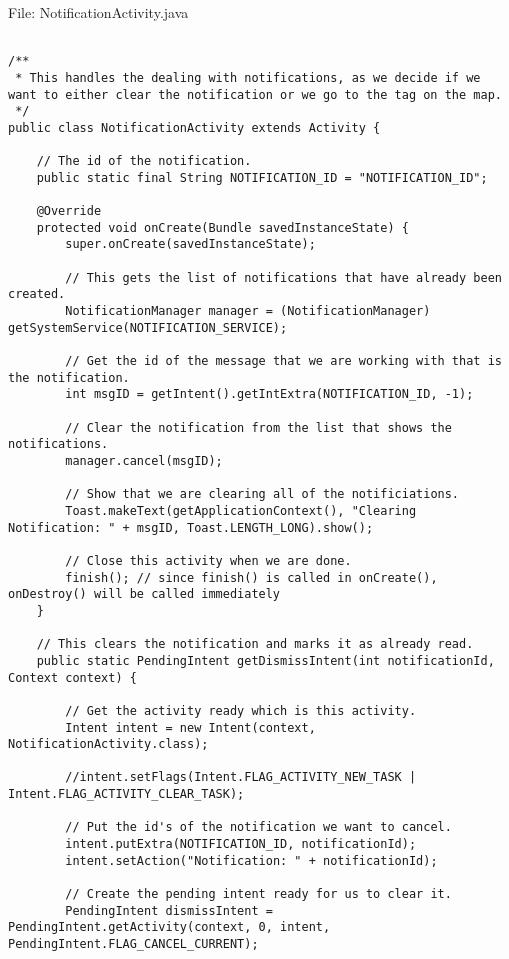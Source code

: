 File: NotificationActivity.java

\begin{lstlisting}

/**
 * This handles the dealing with notifications, as we decide if we want to either clear the notification or we go to the tag on the map.
 */
public class NotificationActivity extends Activity {

    // The id of the notification.
    public static final String NOTIFICATION_ID = "NOTIFICATION_ID";

    @Override
    protected void onCreate(Bundle savedInstanceState) {
        super.onCreate(savedInstanceState);

        // This gets the list of notifications that have already been created.
        NotificationManager manager = (NotificationManager) getSystemService(NOTIFICATION_SERVICE);

        // Get the id of the message that we are working with that is the notification.
        int msgID = getIntent().getIntExtra(NOTIFICATION_ID, -1);

        // Clear the notification from the list that shows the notifications.
        manager.cancel(msgID);

        // Show that we are clearing all of the notificiations.
        Toast.makeText(getApplicationContext(), "Clearing Notification: " + msgID, Toast.LENGTH_LONG).show();

        // Close this activity when we are done.
        finish(); // since finish() is called in onCreate(), onDestroy() will be called immediately
    }

    // This clears the notification and marks it as already read.
    public static PendingIntent getDismissIntent(int notificationId, Context context) {

        // Get the activity ready which is this activity.
        Intent intent = new Intent(context, NotificationActivity.class);

        //intent.setFlags(Intent.FLAG_ACTIVITY_NEW_TASK | Intent.FLAG_ACTIVITY_CLEAR_TASK);

        // Put the id's of the notification we want to cancel.
        intent.putExtra(NOTIFICATION_ID, notificationId);
        intent.setAction("Notification: " + notificationId);

        // Create the pending intent ready for us to clear it.
        PendingIntent dismissIntent = PendingIntent.getActivity(context, 0, intent, PendingIntent.FLAG_CANCEL_CURRENT);


\end{lstlisting}
